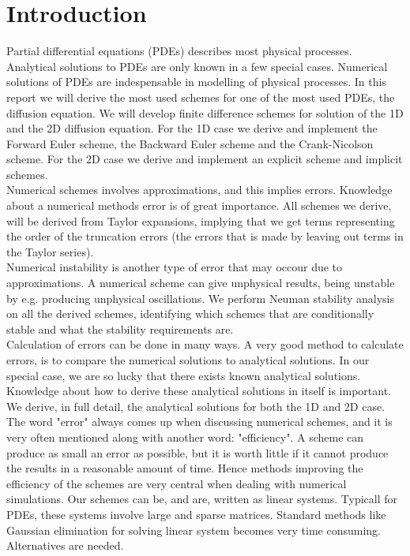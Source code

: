 \documentclass{article}
\begin{document}
\section{Introduction}
Partial differential equations (PDEs) describes most physical processes. Analytical solutions to PDEs are only known in a few special cases. Numerical solutions of PDEs are indespensable in modelling of physical processes. In this report we will derive the most used schemes for one of the most used PDEs, the diffusion equation. We will develop finite difference schemes for solution of the 1D and the 2D diffusion equation. For the 1D case we derive and implement the Forward Euler scheme, the Backward Euler scheme and the Crank-Nicolson scheme. For the 2D case we derive and implement an explicit scheme and implicit schemes.\\

Numerical schemes involves approximations, and this implies errors. Knowledge about a numerical methods error is of great importance. All schemes we derive, will be derived from Taylor expansions, implying that we get terms representing the order of the truncation errors (the errors that is made by leaving out terms in the Taylor series). \\

Numerical instability is another type of error that may occour due to approximations. A numerical scheme can give unphysical results, being unstable by e.g. producing unphysical oscillations. We perform Neuman stability analysis on all the derived schemes, identifying which schemes that are conditionally stable and what the stability requirements are.\\

Calculation of errors can be done in many ways. A very good method to calculate errors, is to compare the numerical solutions to analytical solutions. In our special case, we are so lucky that there exists known analytical solutions. Knowledge about how to derive these analytical solutions in itself is important. We derive, in full detail, the analytical solutions for both the 1D and 2D case.\\

The word "error" always comes up when discussing numerical schemes, and it is very often mentioned along with another word: "efficiency". A scheme can produce as small an error as possible, but it is worth little if it cannot produce the results in a reasonable amount of time. Hence methods improving the efficiency of the schemes are very central when dealing with numerical simulations. Our schemes can be, and are, written as linear systems. Typicall for PDEs, these systems involve large and sparse matrices. Standard methods like Gaussian elimination for solving linear system becomes very time consuming. Alternatives are needed. \\
\end{document}
